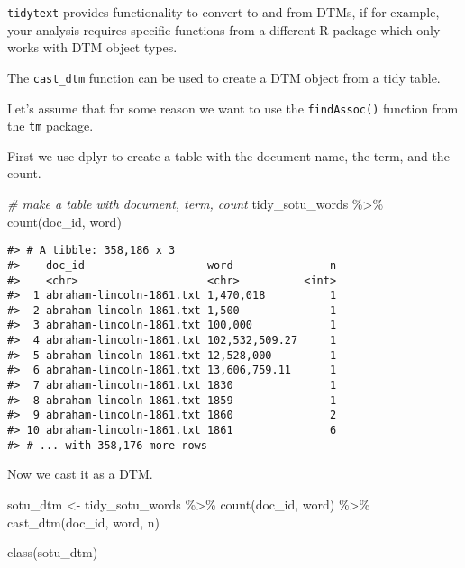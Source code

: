 \documentclass[
]{book}
\newenvironment{Shaded}{\begin{snugshade}}{\end{snugshade}}
\newcommand{\CommentTok}[1]{\textcolor[rgb]{0.56,0.35,0.01}{\textit{#1}}}
\newcommand{\FunctionTok}[1]{\textcolor[rgb]{0.00,0.00,0.00}{#1}}
\newcommand{\NormalTok}[1]{#1}
\newcommand{\OtherTok}[1]{\textcolor[rgb]{0.56,0.35,0.01}{#1}}
\newcommand{\SpecialCharTok}[1]{\textcolor[rgb]{0.00,0.00,0.00}{#1}}
\begin{document}
\texttt{tidytext} provides functionality to convert to and from DTMs, if for example, your analysis requires specific functions from a different R package which only works with DTM object types.

The \texttt{cast\_dtm} function can be used to create a DTM object from a tidy table.

Let's assume that for some reason we want to use the \texttt{findAssoc()} function from the \texttt{tm} package.

First we use dplyr to create a table with the document name, the term, and the count.

\begin{Shaded}
\begin{Highlighting}[]
\CommentTok{\# make a table with document, term, count}
\NormalTok{tidy\_sotu\_words }\SpecialCharTok{\%\textgreater{}\%} 
  \FunctionTok{count}\NormalTok{(doc\_id, word) }
\end{Highlighting}
\end{Shaded}

\begin{verbatim}
#> # A tibble: 358,186 x 3
#>    doc_id                   word               n
#>    <chr>                    <chr>          <int>
#>  1 abraham-lincoln-1861.txt 1,470,018          1
#>  2 abraham-lincoln-1861.txt 1,500              1
#>  3 abraham-lincoln-1861.txt 100,000            1
#>  4 abraham-lincoln-1861.txt 102,532,509.27     1
#>  5 abraham-lincoln-1861.txt 12,528,000         1
#>  6 abraham-lincoln-1861.txt 13,606,759.11      1
#>  7 abraham-lincoln-1861.txt 1830               1
#>  8 abraham-lincoln-1861.txt 1859               1
#>  9 abraham-lincoln-1861.txt 1860               2
#> 10 abraham-lincoln-1861.txt 1861               6
#> # ... with 358,176 more rows
\end{verbatim}

Now we cast it as a DTM.

\begin{Shaded}
\begin{Highlighting}[]
\NormalTok{sotu\_dtm }\OtherTok{\textless{}{-}}\NormalTok{ tidy\_sotu\_words }\SpecialCharTok{\%\textgreater{}\%} 
  \FunctionTok{count}\NormalTok{(doc\_id, word) }\SpecialCharTok{\%\textgreater{}\%} 
  \FunctionTok{cast\_dtm}\NormalTok{(doc\_id, word, n) }

\FunctionTok{class}\NormalTok{(sotu\_dtm)}
\end{Highlighting}
\end{Shaded}
\end{document}

